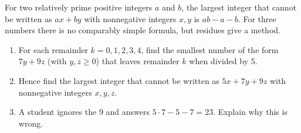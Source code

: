 For two relatively prime positive integers $a$ and $b$, the largest integer that cannot be written as $ax+by$ with nonnegative integers $x,y$ is $ab-a-b$. For three numbers there is no comparably simple formula, but residues give a method.
\begin{enumerate}
\item[(a)] For each remainder $k=0,1,2,3,4$, find the smallest number of the form $7y+9z$ (with $y,z\ge0$) that leaves remainder $k$ when divided by $5$.
\item[(b)] Hence find the largest integer that cannot be written as $5x+7y+9z$ with nonnegative integers $x,y,z$.
\item[(c)] A student ignores the $9$ and answers $5\cdot7-5-7=23$. Explain why this is wrong.
\end{enumerate}
